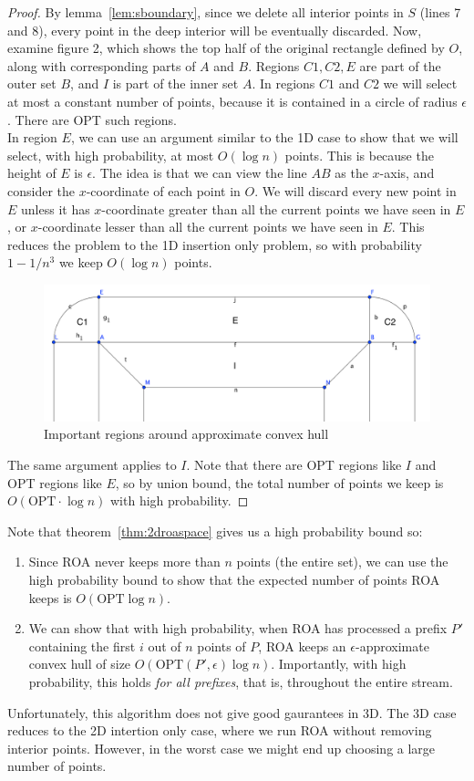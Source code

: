 \begin{proof}
By lemma~\ref{lem:sboundary}, since we delete all interior points in $S$ (lines 7 and 8), every point in the deep interior will be eventually discarded. Now, examine figure 2, which shows the top half of the original rectangle defined by $O$, along with corresponding parts of $A$ and $B$. Regions $C1, C2, E$ are part of the outer set $B$, and $I$ is part of the inner set $A$. In regions $C1$ and $C2$ we will select at most a constant number of points, because it is contained in a circle of radius $\epsilon$. There are OPT such regions. 
\\

In region $E$, we can use an argument similar to the 1D case to show that we will select, with high probability, at most $O(\log{n})$ points. This is because the height of $E$ is $\epsilon$. The idea is that we can view the line $AB$ as the $x$-axis, and consider the $x$-coordinate of each point in $O$. We will discard every new point in $E$ unless it has $x$-coordinate greater than all the current points we have seen in $E$, or $x$-coordinate lesser than all the current points we have seen in $E$. This reduces the problem to the 1D insertion only problem, so with probability $1-1/n^3$ we keep $O(\log{n})$ points.
\\

\begin{figure}
\includegraphics[width=\linewidth]{main_regions}
\caption{Important regions around approximate convex hull}\label{fig:tiger}
\end{figure}

The same argument applies to $I$. Note that there are OPT regions like $I$ and OPT regions like $E$, so by union bound, the total number of points we keep is $O(\mbox{OPT} \cdot \log{n})$ with high probability.
\end{proof}

Note that theorem~\ref{thm:2droaspace} gives us a high probability bound so:
\begin{enumerate}
\item Since ROA never keeps more than $n$ points (the entire set), we can use the high probability bound to show that the expected number of points ROA keeps is $O(\mbox{OPT}\log{n})$.
\item We can show that with high probability, when ROA has processed a prefix $P'$ containing the first $i$ out of $n$ points of $P$, ROA keeps an $\epsilon$-approximate convex hull of size $O(\mbox{OPT}(P', \epsilon)\log{n})$. Importantly, with high probability, this holds \emph{for all prefixes}, that is, throughout the entire stream.
\end{enumerate}

Unfortunately, this algorithm does not give good gaurantees in 3D. The 3D case reduces to the 2D intertion only case, where we run ROA without removing interior points. However, in the worst case we might end up choosing a large number of points.
